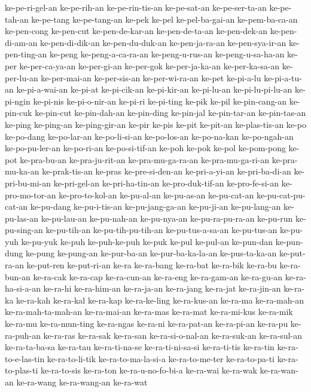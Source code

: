 {ke-pe-ri-gel-an ke-pe-rih-an ke-pe-rin-tis-an ke-pe-sat-an ke-pe-ser-ta-an
ke-pe-tah-an ke-pe-tang ke-pe-tang-an ke-pek ke-pel ke-pel-ba-gai-an
ke-pem-ba-ca-an ke-pen-cong ke-pen-cut ke-pen-de-kar-an ke-pen-de-ta-an
ke-pen-dek-an ke-pen-di-am-an ke-pen-di-dik-an ke-pen-du-duk-an
ke-pen-ja-ra-an ke-pen-sya-ir-an ke-pen-ting-an ke-peng ke-peng-a-ca-ra-an
ke-peng-u-rus-an ke-peng-u-sa-ha-an ke-per ke-per-ca-ya-an ke-per-gi-an
ke-per-gok ke-per-ja-ka-an ke-per-ka-sa-an ke-per-lu-an ke-per-mai-an
ke-per-sis-an ke-per-wi-ra-an ke-pet ke-pi-a-lu ke-pi-a-tu-an
ke-pi-a-wai-an ke-pi-at ke-pi-cik-an ke-pi-kir-an ke-pi-lu-an
ke-pi-lu-pi-lu-an ke-pi-ngin ke-pi-nis ke-pi-o-nir-an ke-pi-ri ke-pi-ting
ke-pik ke-pil ke-pin-cang-an ke-pin-cuk ke-pin-cut ke-pin-dah-an
ke-pin-ding ke-pin-jal ke-pin-tar-an ke-pin-tas-an ke-ping ke-ping-an
ke-ping-gir-an ke-pir ke-pis ke-pit ke-pit-an ke-plas-tis-an ke-po
ke-po-dang ke-po-lar-an ke-po-li-si-an ke-po-los-an ke-po-na-kan
ke-po-ngah-an ke-po-pu-ler-an ke-po-ri-an ke-po-si-tif-an ke-poh ke-pok
ke-pol ke-pom-pong ke-pot ke-pra-bu-an ke-pra-ju-rit-an ke-pra-mu-ga-ra-an
ke-pra-mu-ga-ri-an ke-pra-mu-ka-an ke-prak-tis-an ke-pras ke-pre-si-den-an
ke-pri-a-yi-an ke-pri-ba-di-an ke-pri-bu-mi-an ke-pri-gel-an
ke-pri-ha-tin-an ke-pro-duk-tif-an ke-pro-fe-si-an ke-pro-mo-tor-an
ke-pro-to-kol-an ke-pu-al-an ke-pu-as-an ke-pu-cat-an ke-pu-cat-pu-cat-an
ke-pu-dang ke-pu-i-tis-an ke-pu-jang-ga-an ke-pu-ji-an ke-pu-lang-an
ke-pu-las-an ke-pu-lau-an ke-pu-nah-an ke-pu-nya-an ke-pu-ra-pu-ra-an
ke-pu-run ke-pu-sing-an ke-pu-tih-an ke-pu-tih-pu-tih-an ke-pu-tus-a-sa-an
ke-pu-tus-an ke-pu-yuh ke-pu-yuk ke-puh ke-puh-ke-puh ke-puk ke-pul
ke-pul-an ke-pun-dan ke-pun-dung ke-pung ke-pung-an ke-pur-ba-an
ke-pur-ba-ka-la-an ke-pus-ta-ka-an ke-put-ra-an ke-put-ren ke-put-ri-an
ke-ra ke-ra-bang ke-ra-bat ke-ra-bik ke-ra-bu ke-ra-bun-an ke-ra-cak
ke-ra-cap ke-ra-cun-an ke-ra-eng ke-ra-gam-an ke-ra-gu-an ke-ra-ha-si-a-an
ke-ra-hi ke-ra-him-an ke-ra-ja-an ke-ra-jang ke-ra-jat ke-ra-jin-an
ke-ra-ka ke-ra-kah ke-ra-kal ke-ra-kap ke-ra-ke-ling ke-ra-kus-an ke-ra-ma
ke-ra-mah-an ke-ra-mah-ta-mah-an ke-ra-mai-an ke-ra-mas ke-ra-mat
ke-ra-mi-kus ke-ra-mik ke-ra-mu ke-ra-mun-ting ke-ra-ngas ke-ra-ni
ke-ra-pat-an ke-ra-pi-an ke-ra-pu ke-ra-puh-an ke-ra-ras ke-ra-sak
ke-ra-san ke-ra-si-o-nal-an ke-ra-suk-an ke-ra-sul-an ke-ra-ta-ba-sa
ke-ra-tau ke-ra-ti-na-se ke-ra-ti-ni-sa-si ke-ra-ti-tis ke-ra-tin
ke-ra-to-e-las-tin ke-ra-to-li-tik ke-ra-to-ma-la-si-a ke-ra-to-me-ter
ke-ra-to-pa-ti ke-ra-to-plas-ti ke-ra-to-sis ke-ra-ton ke-ra-u-no-fo-bi-a
ke-ra-wai ke-ra-wak ke-ra-wan-an ke-ra-wang ke-ra-wang-an ke-ra-wat
}
